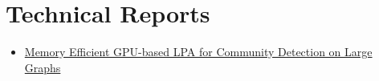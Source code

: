 \section*{Technical Reports}

\begin{itemize}[noitemsep, leftmargin=*]
  \item \href{https://arxiv.org/abs/2411.19901}{Memory Efficient GPU-based LPA for Community Detection on Large Graphs}
\end{itemize}
